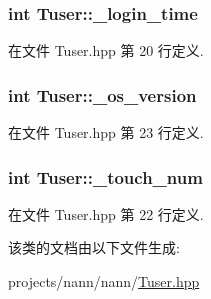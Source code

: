 \subsubsection[{\+\_\+login\+\_\+time}]{\setlength{\rightskip}{0pt plus 5cm}int Tuser\+::\+\_\+login\+\_\+time}\label{class_tuser_a0545ffd37e769c80464f431aeb08df99}


在文件 Tuser.\+hpp 第 20 行定义.

\hypertarget{class_tuser_a1a88701de1c3ffb4f5ee964bfa940e51}{}
\subsubsection[{\+\_\+os\+\_\+version}]{\setlength{\rightskip}{0pt plus 5cm}int Tuser\+::\+\_\+os\+\_\+version}\label{class_tuser_a1a88701de1c3ffb4f5ee964bfa940e51}


在文件 Tuser.\+hpp 第 23 行定义.

\hypertarget{class_tuser_a4a4fe058fa573458edeee9555d90cb43}{}
\subsubsection[{\+\_\+touch\+\_\+num}]{\setlength{\rightskip}{0pt plus 5cm}int Tuser\+::\+\_\+touch\+\_\+num}\label{class_tuser_a4a4fe058fa573458edeee9555d90cb43}


在文件 Tuser.\+hpp 第 22 行定义.



该类的文档由以下文件生成\+:\begin{DoxyCompactItemize}
\item 
projects/nann/nann/\hyperlink{_tuser_8hpp}{Tuser.\+hpp}\end{DoxyCompactItemize}
